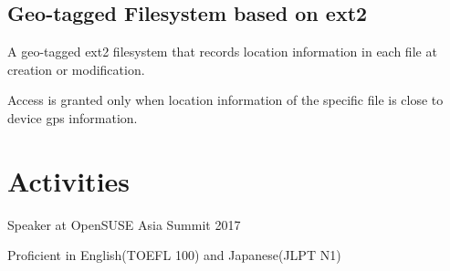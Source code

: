 \documentclass[letterpaper]{article}
\def\footerlink{http://github.com/alapha23/}
\renewenvironment{itemize}{
  \begin{list}{}{
    \setlength{\leftmargin}{1.5em}
  }
}{
  \end{list}
}
\begin{document}
\subsection*{Geo-tagged Filesystem based on ext2}
\begin{itemize}
\item A geo-tagged ext2 filesystem that records location information in each file at creation or modification.
\item Access is granted only when location information of the specific file is close to device gps information.
\end{itemize}

\section*{Activities}
\begin{itemize}
\item Speaker at OpenSUSE Asia Summit 2017
\end{itemize}
\begin{itemize}
	\item Proficient in English(TOEFL 100) and Japanese(JLPT N1)
\end{itemize}

%
%

%

\bigskip

\end{document}
